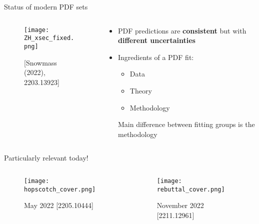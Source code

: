 \begin{frame}{Status of modern PDF sets}
  \begin{columns}
    \begin{column}{0.49\textwidth}
      \begin{figure}
        \centering
        \texttt{[image: ZH\_xsec\_fixed.png]}
        \caption*{[Snowmass (2022), 2203.13923]}
      \end{figure}
    \end{column}
    \begin{column}{0.49\textwidth}
      \begin{itemize}
        \item PDF predictions are {\bfseries consistent} but with {\bfseries different uncertainties}
        \item Ingredients of a PDF fit:
        \begin{itemize}
          \item Data
          \item Theory
          \item Methodology
        \end{itemize}
        \begin{minipage}{0.8\textwidth}
          \begin{block}{}
            {Main difference between fitting groups is the methodology}
          \end{block}
        \end{minipage}
      \end{itemize}
    \end{column}
  \end{columns}
\end{frame}


\begin{frame}[t]{Particularly relevant today!}
  \begin{columns}
    \begin{column}{0.49\textwidth}
      \begin{figure}
        \texttt{[image: hopscotch\_cover.png]}
        \caption*{May 2022 [2205.10444]}
      \end{figure}
    \end{column}
    \begin{column}{0.49\textwidth}
      \begin{figure}
        \texttt{[image: rebuttal\_cover.png]}
        \caption*{November 2022 [2211.12961]}
      \end{figure}
    \end{column}
  \end{columns}
\end{frame}




